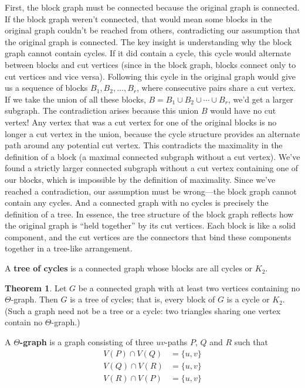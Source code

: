 \documentclass{article}
\theoremstyle{definition}
\newtheorem{theorem}{Theorem}
\begin{document}
First, the block graph must be connected because the original graph is connected. If the block graph weren't connected, that would mean some blocks in the original graph couldn't be reached from others, contradicting our assumption that the original graph is connected. The key insight is understanding why the block graph cannot contain cycles. If it did contain a cycle, this cycle would alternate between blocks and cut vertices (since in the block graph, blocks connect only to cut vertices and vice versa). Following this cycle in the original graph would give us a sequence of blocks $B_1, B_2, \ldots, B_r$, where consecutive pairs share a cut vertex. If we take the union of all these blocks, $B = B_1 \cup B_2 \cup \cdots \cup B_r$, we'd get a larger subgraph. The contradiction arises because this union $B$ would have no cut vertex! Any vertex that was a cut vertex for one of the original blocks is no longer a cut vertex in the union, because the cycle structure provides an alternate path around any potential cut vertex. This contradicts the maximality in the definition of a block (a maximal connected subgraph without a cut vertex). We've found a strictly larger connected subgraph without a cut vertex containing one of our blocks, which is impossible by the definition of maximality. Since we've reached a contradiction, our assumption must be wrong—the block graph cannot contain any cycles. And a connected graph with no cycles is precisely the definition of a tree. In essence, the tree structure of the block graph reflects how the original graph is ``held together'' by its cut vertices. Each block is like a solid component, and the cut vertices are the connectors that bind these components together in a tree-like arrangement.

A \textbf{tree of cycles} is a connected graph whose blocks are all cycles or $K_2$.

\begin{theorem}\label{thm:theta-free}
Let $G$ be a connected graph with at least two vertices containing no $\Theta$-graph. Then $G$ is a tree of cycles; that is, every block of $G$ is a cycle or $K_2$. (Such a graph need not be a tree or a cycle: two triangles sharing one vertex contain no $\Theta$-graph.)

A \textbf{$\Theta$-graph} is a graph consisting of three $uv$-paths $P$, $Q$ and $R$ such that
\begin{align*}
V(P) \cap V(Q) &= \{u, v\} \\
V(Q) \cap V(R) &= \{u, v\} \\
V(R) \cap V(P) &= \{u, v\}
\end{align*}
\end{theorem}
\end{document}

